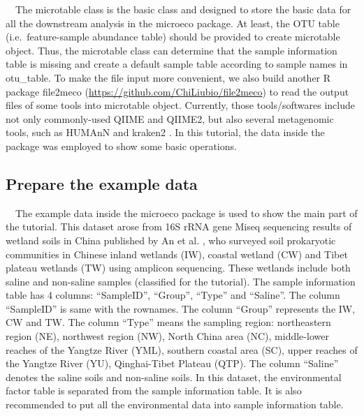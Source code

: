 \documentclass[
]{book}
\begin{document}
　The microtable class is the basic class and designed to store the basic data for all the downstream analysis in the microeco package.
At least, the OTU table (i.e.~feature-sample abundance table) should be provided to create microtable object.
Thus, the microtable class can determine that the sample information table is missing and create a default sample table according to
sample names in otu\_table.
To make the file input more convenient,
we also build another R package file2meco (\url{https://github.com/ChiLiubio/file2meco}) to read the output files of some tools into microtable object.
Currently, those tools/softwares include not only commonly-used QIIME \citep{Caporaso_QIIME_2010} and QIIME2\citep{Bolyen_Reproducible_2019},
but also several metagenomic tools, such as HUMAnN \citep{Franzosa_Species_2018} and kraken2 \citep{Wood_Improved_2019}.
In this tutorial, the data inside the package was employed to show some basic operations.

\hypertarget{prepare-the-example-data}{%
\subsection{Prepare the example data}\label{prepare-the-example-data}}

　The example data inside the microeco package is used to show the main part of the tutorial.
This dataset arose from 16S rRNA gene Miseq sequencing results of wetland soils in China published by An et al. \citep{An_Soil_2019},
who surveyed soil prokaryotic communities in Chinese inland wetlands (IW),
coastal wetland (CW) and Tibet plateau wetlands (TW) using amplicon sequencing.
These wetlands include both saline and non-saline samples (classified for the tutorial).
The sample information table has 4 columns: ``SampleID'', ``Group'', ``Type'' and ``Saline''.
The column ``SampleID'' is same with the rownames.
The column ``Group'' represents the IW, CW and TW.
The column ``Type'' means the sampling region: northeastern region (NE), northwest region (NW), North China area (NC),
middle-lower reaches of the Yangtze River (YML), southern coastal area (SC), upper reaches of the Yangtze River (YU), Qinghai-Tibet Plateau (QTP).
The column ``Saline'' denotes the saline soils and non-saline soils.
In this dataset, the environmental factor table is separated from the sample information table.
It is also recommended to put all the environmental data into sample information table.
\end{document}

